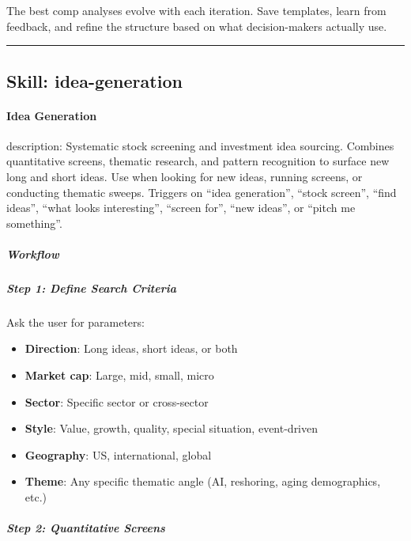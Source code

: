 \documentclass[11pt]{article}
\begin{document}
The best comp analyses evolve with each iteration. Save templates, learn from feedback, and refine the structure based on what decision-makers actually use.


\vspace{0.8em}\hrule\vspace{0.8em}

\subsection{Skill: idea-generation}\label{file:market-researcher-skills-idea-generation-SKILL-md}

\paragraph{Idea Generation}\mbox{}\par

description: Systematic stock screening and investment idea sourcing. Combines quantitative screens, thematic research, and pattern recognition to surface new long and short ideas. Use when looking for new ideas, running screens, or conducting thematic sweeps. Triggers on ``idea generation'', ``stock screen'', ``find ideas'', ``what looks interesting'', ``screen for'', ``new ideas'', or ``pitch me something''.


\subparagraph{Workflow}\mbox{}\par

\subparagraph{Step 1: Define Search Criteria}\mbox{}\par

Ask the user for parameters:

\begin{itemize}[leftmargin=*,itemsep=2pt,topsep=2pt]
\item {} \textbf{Direction}: Long ideas, short ideas, or both
\item {} \textbf{Market cap}: Large, mid, small, micro
\item {} \textbf{Sector}: Specific sector or cross-sector
\item {} \textbf{Style}: Value, growth, quality, special situation, event-driven
\item {} \textbf{Geography}: US, international, global
\item {} \textbf{Theme}: Any specific thematic angle (AI, reshoring, aging demographics, etc.)
\end{itemize}

\subparagraph{Step 2: Quantitative Screens}\mbox{}\par
\end{document}
